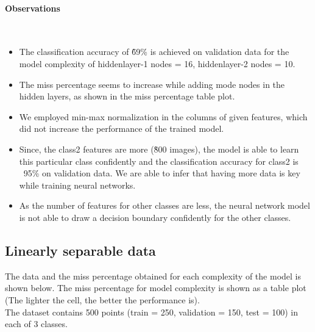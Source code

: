 \documentclass[fleqn]{article}
\newcommand{\myparagraph}[1]{\paragraph{#1}\mbox{}\\}
\begin{document}
\myparagraph{Observations}

\begin{itemize}
  \item The classification accuracy of \~69\% is achieved on validation data for the model complexity of hiddenlayer-1 nodes = 16, hiddenlayer-2 nodes = 10.
  \item The miss percentage seems to increase while adding mode nodes in the hidden layers, as shown in the miss percentage table plot.
  \item We employed min-max normalization in the columns of given features, which did not increase the performance of the trained model. 
  \item Since, the class2 features are more (\~800 images), the model is able to learn this particular class confidently and the classification accuracy for class2 is ~95\% on validation data.
  We are able to infer that having more data is key while training neural networks.
  \item As the number of features for other classes are less, the neural network model is not able to draw a decision boundary confidently for the other classes.
\end{itemize}

\newpage
\subsection{Linearly separable data}

The data and the miss percentage obtained for each complexity of the model is shown below. The miss percentage for model complexity is shown as a table plot (The lighter the cell, the better the performance is).\\
The dataset contains 500 points (train = 250, validation = 150, test = 100) in each of 3 classes.
\end{document}
